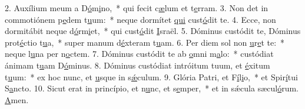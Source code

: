 2. Auxílium meum a D\uline{ó}m\uline{i}no,~* qui fecit c\uline{æ}lum et t\uline{e}rram.
3. Non det in commotiónem p\uline{e}dem t\uline{u}um:~* neque dormítet \uline{qui} cust\uline{ó}dit te.
4. Ecce, non dormitábit neque d\uline{ó}rm\uline{i}et,~* qui cust\uline{ó}dit \uline{I}sraël.
5. Dóminus custódit te, Dóminus prot\uline{é}ctio t\uline{u}a,~* super manum d\uline{é}xteram t\uline{u}am.
6. Per diem sol non \uline{u}r\uline{e}t te:~* neque l\uline{u}na per n\uline{o}ctem.
7. Dóminus custódit te ab \uline{o}mni m\uline{a}lo:~* custódiat ánimam t\uline{u}am D\uline{ó}minus.
8. Dóminus custódiat intróitum tuum, et \uline{é}xitum t\uline{u}um:~* ex hoc nunc, et \uline{u}sque in s\uline{ǽ}culum.
9. Glória Patri, et F\uline{í}l\uline{i}o,~* et Spir\uline{í}tui S\uline{a}ncto.
10. Sicut erat in princípio, et n\uline{u}nc, et s\uline{e}mper,~* et in sǽcula sæcul\uline{ó}rum. \uline{A}men.
